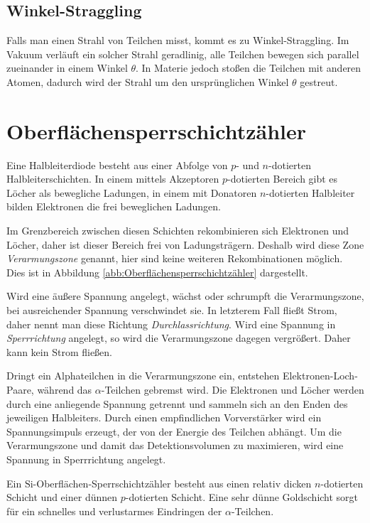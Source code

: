 \documentclass[12pt,a4paper]{scrartcl}
\numberwithin{equation}{section} %
\renewcommand{\[}{} %
\renewcommand{\]}{\noindent} %
\begin{document}
\hypertarget{winkel-straggling}{%
\subsection{Winkel-Straggling}\label{winkel-straggling}}

Falls man einen Strahl von Teilchen misst, kommt es zu
Winkel-Straggling. Im Vakuum verläuft ein solcher Strahl geradlinig,
alle Teilchen bewegen sich parallel zueinander in einem Winkel
$\theta$. In Materie jedoch stoßen die Teilchen mit anderen Atomen,
dadurch wird der Strahl um den ursprünglichen Winkel $\theta$
gestreut.

\hypertarget{oberfluxe4chensperrschichtzuxe4hler}{%
\section{Oberflächensperrschichtzähler}\label{oberfluxe4chensperrschichtzuxe4hler}}

Eine Halbleiterdiode besteht aus einer Abfolge von $p$- und
$n$-dotierten Halbleiterschichten. In einem mittels Akzeptoren
$p$-dotierten Bereich gibt es Löcher als bewegliche Ladungen, in einem
mit Donatoren $n$-dotierten Halbleiter bilden Elektronen die frei
beweglichen Ladungen.

Im Grenzbereich zwischen diesen Schichten rekombinieren sich Elektronen
und Löcher, daher ist dieser Bereich frei von Ladungsträgern. Deshalb
wird diese Zone \emph{Verarmungszone} genannt, hier sind keine weiteren
Rekombinationen möglich. Dies ist in Abbildung \ref{abb:Oberflächensperrschichtzähler} dargestellt.

Wird eine äußere Spannung angelegt, wächst oder schrumpft die
Verarmungszone, bei ausreichender Spannung verschwindet sie. In
letzterem Fall fließt Strom, daher nennt man diese Richtung
\emph{Durchlassrichtung}. Wird eine Spannung in \emph{Sperrrichtung}
angelegt, so wird die Verarmungszone dagegen vergrößert. Daher kann kein
Strom fließen.

Dringt ein Alphateilchen in die Verarmungszone ein, entstehen
Elektronen-Loch-Paare, während das $\alpha$-Teilchen gebremst wird.
Die Elektronen und Löcher werden durch eine anliegende Spannung getrennt
und sammeln sich an den Enden des jeweiligen Halbleiters. Durch einen
empfindlichen Vorverstärker wird ein Spannungsimpuls erzeugt, der von
der Energie des Teilchen abhängt. Um die Verarmungszone und damit das
Detektionsvolumen zu maximieren, wird eine Spannung in Sperrrichtung
angelegt.

Ein $\mathrm{Si}$-Oberflächen-Sperrschichtzähler besteht aus einen
relativ dicken $n$-dotierten Schicht und einer dünnen $p$-dotierten
Schicht. Eine sehr dünne Goldschicht sorgt für ein schnelles und
verlustarmes Eindringen der $\alpha$-Teilchen.
\end{document}
